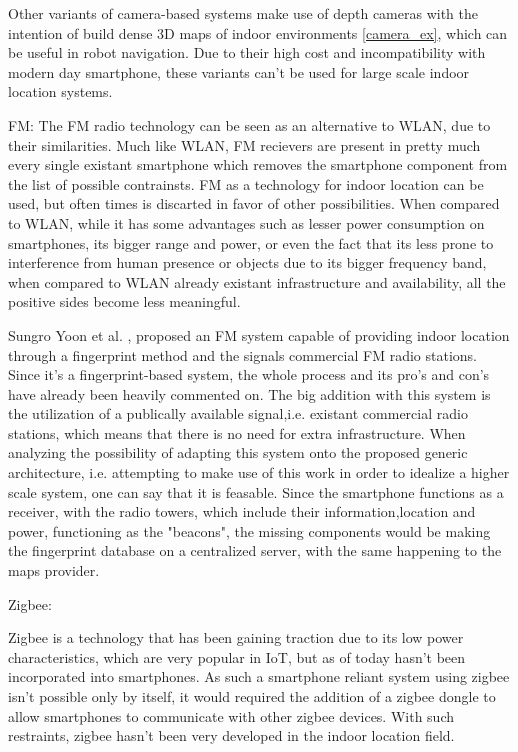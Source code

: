 	Other variants of camera-based systems make use of depth cameras with the intention of build dense 3D maps of indoor environments \ref{camera_ex}, which can be useful in robot navigation. Due to their high cost and incompatibility with modern day smartphone, these variants can't be used for large scale indoor location systems.


FM: 
	The \ac{FM} radio technology can be seen as an alternative to WLAN, due to their similarities. Much like WLAN, \ac{FM} recievers are present in pretty much every single existant smartphone which removes the smartphone component from the list of possible contrainsts. FM as a technology for indoor location can be used, but often times is discarted in favor of other possibilities. When compared to WLAN, while it has some advantages such as lesser power consumption on smartphones, its bigger range and power, or even the fact that its less prone to interference from human presence or objects due to its bigger frequency band, when compared to WLAN already existant infrastructure and availability, all the positive sides become less meaningful. 

	Sungro Yoon et al. \cite{fm_ex}, proposed an \ac{FM} system capable of providing indoor location through a fingerprint method and the signals commercial \ac{FM} radio stations. Since it's a fingerprint-based system, the whole process and its pro's and con's have already been heavily commented on. The big addition with this system is the utilization of a publically available signal,i.e. existant commercial radio stations, which means that there is no need for extra infrastructure. 
	When analyzing the possibility of adapting this system onto the proposed generic architecture, i.e. attempting to make use of this work in order to idealize a higher scale system, one can say that it is feasable. Since the smartphone functions as a receiver, with the radio towers, which include their information,location and power, functioning as the "beacons", the missing components would be making the fingerprint database on a centralized server, with the same happening to the maps provider.
 

Zigbee:

	Zigbee is a technology that has been gaining traction due to its low power characteristics, which are very popular in \ac{IoT}, but as of today hasn't been incorporated into smartphones. As such a smartphone reliant system using zigbee isn't possible only by itself, it would required the addition of a zigbee dongle to allow smartphones to communicate with other zigbee devices. With such restraints, zigbee hasn't been very developed in the indoor location field.
	
